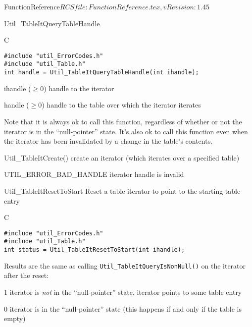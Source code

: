 \begin{cactuspart}{5}{FunctionReference}{$RCSfile: FunctionReference.tex,v $}{$Revision: 1.45 $}
\begin{FunctionDescription}{Util\_TableItQueryTableHandle}
\begin{Synopsis}{C}
\begin{verbatim}
#include "util_ErrorCodes.h"
#include "util_Table.h"
int handle = Util_TableItQueryTableHandle(int ihandle);
\end{verbatim}
\end{Synopsis}

\begin{Parameter}{ihandle ($\ge 0$)}
handle to the iterator
\end{Parameter}

\begin{Result}{handle ($\ge 0$)}
handle to the table over which the iterator iterates
\end{Result}

\begin{Discussion}
Note that it is always ok to call this function, regardless of
whether or not the iterator is in the ``null-pointer'' state.
\NewPar
It's also ok to call this function even when the iterator has been
invalidated by a change in the table's contents.
\end{Discussion}

\begin{SeeAlso}{Util\_TableItCreate()}
create an iterator (which iterates over a specified table)
\end{SeeAlso}

\begin{Error}{UTIL\_ERROR\_BAD\_HANDLE}
iterator handle is invalid
\end{Error}
\end{FunctionDescription}


\begin{FunctionDescription}{Util\_TableItResetToStart}
\label{Util-TableItResetToStart}
Reset a table iterator to point to the starting table entry

\begin{Synopsis}{C}
\begin{verbatim}
#include "util_ErrorCodes.h"
#include "util_Table.h"
int status = Util_TableItResetToStart(int ihandle);
\end{verbatim}
\end{Synopsis}

\begin{ResultNote}
Results are the same as calling \verb|Util_TableItQueryIsNonNull()|
on the iterator after the reset:
\end{ResultNote}
\begin{Result}{\rm 1}
iterator is {\em not\/} in the ``null-pointer'' state,
\ie{} iterator points to some table entry
\end{Result}
\begin{Result}{\rm 0}
iterator is in the ``null-pointer'' state
(this happens if and only if the table is empty)
\end{Result}


\end{FunctionDescription}
\end{cactuspart}
